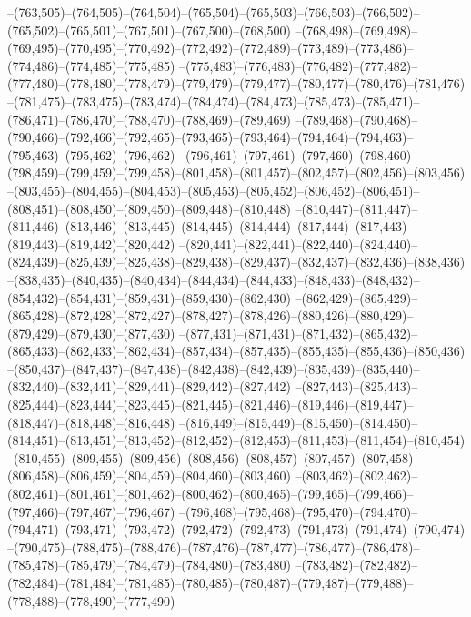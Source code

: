 --(763,505)--(764,505)--(764,504)--(765,504)--(765,503)--(766,503)--(766,502)--(765,502)--(765,501)--(767,501)--(767,500)--(768,500)
--(768,498)--(769,498)--(769,495)--(770,495)--(770,492)--(772,492)--(772,489)--(773,489)--(773,486)--(774,486)--(774,485)--(775,485)
--(775,483)--(776,483)--(776,482)--(777,482)--(777,480)--(778,480)--(778,479)--(779,479)--(779,477)--(780,477)--(780,476)--(781,476)
--(781,475)--(783,475)--(783,474)--(784,474)--(784,473)--(785,473)--(785,471)--(786,471)--(786,470)--(788,470)--(788,469)--(789,469)
--(789,468)--(790,468)--(790,466)--(792,466)--(792,465)--(793,465)--(793,464)--(794,464)--(794,463)--(795,463)--(795,462)--(796,462)
--(796,461)--(797,461)--(797,460)--(798,460)--(798,459)--(799,459)--(799,458)--(801,458)--(801,457)--(802,457)--(802,456)--(803,456)
--(803,455)--(804,455)--(804,453)--(805,453)--(805,452)--(806,452)--(806,451)--(808,451)--(808,450)--(809,450)--(809,448)--(810,448)
--(810,447)--(811,447)--(811,446)--(813,446)--(813,445)--(814,445)--(814,444)--(817,444)--(817,443)--(819,443)--(819,442)--(820,442)
--(820,441)--(822,441)--(822,440)--(824,440)--(824,439)--(825,439)--(825,438)--(829,438)--(829,437)--(832,437)--(832,436)--(838,436)
--(838,435)--(840,435)--(840,434)--(844,434)--(844,433)--(848,433)--(848,432)--(854,432)--(854,431)--(859,431)--(859,430)--(862,430)
--(862,429)--(865,429)--(865,428)--(872,428)--(872,427)--(878,427)--(878,426)--(880,426)--(880,429)--(879,429)--(879,430)--(877,430)
--(877,431)--(871,431)--(871,432)--(865,432)--(865,433)--(862,433)--(862,434)--(857,434)--(857,435)--(855,435)--(855,436)--(850,436)
--(850,437)--(847,437)--(847,438)--(842,438)--(842,439)--(835,439)--(835,440)--(832,440)--(832,441)--(829,441)--(829,442)--(827,442)
--(827,443)--(825,443)--(825,444)--(823,444)--(823,445)--(821,445)--(821,446)--(819,446)--(819,447)--(818,447)--(818,448)--(816,448)
--(816,449)--(815,449)--(815,450)--(814,450)--(814,451)--(813,451)--(813,452)--(812,452)--(812,453)--(811,453)--(811,454)--(810,454)
--(810,455)--(809,455)--(809,456)--(808,456)--(808,457)--(807,457)--(807,458)--(806,458)--(806,459)--(804,459)--(804,460)--(803,460)
--(803,462)--(802,462)--(802,461)--(801,461)--(801,462)--(800,462)--(800,465)--(799,465)--(799,466)--(797,466)--(797,467)--(796,467)
--(796,468)--(795,468)--(795,470)--(794,470)--(794,471)--(793,471)--(793,472)--(792,472)--(792,473)--(791,473)--(791,474)--(790,474)
--(790,475)--(788,475)--(788,476)--(787,476)--(787,477)--(786,477)--(786,478)--(785,478)--(785,479)--(784,479)--(784,480)--(783,480)
--(783,482)--(782,482)--(782,484)--(781,484)--(781,485)--(780,485)--(780,487)--(779,487)--(779,488)--(778,488)--(778,490)--(777,490)
